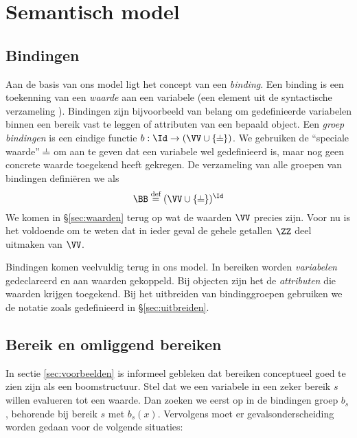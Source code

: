\chapter{Semantisch model}

\section{Bindingen}\label{sec:bindingen}

Aan de basis van ons model ligt het concept van een \emph{binding}. Een binding is een toekenning van een \emph{waarde} aan een variabele (een element uit de syntactische verzameling \Id). Bindingen zijn bijvoorbeeld van belang om gedefinieerde variabelen binnen een bereik vast te leggen of attributen van een bepaald object. Een \emph{groep bindingen} is een eindige functie $b : \Id \to (\VV \cup \{\nil\})$. We gebruiken de ``speciale waarde'' $\nil$ om aan te geven dat een variabele wel gedefinieerd is, maar nog geen concrete waarde toegekend heeft gekregen. De verzameling van alle groepen van bindingen definiëren we als
\begin{equation*}
  \BB \DEF (\VV \cup \{\nil\})^\Id%
\end{equation*}
We komen in §\ref{sec:waarden} terug op wat de waarden $\VV$ precies zijn. Voor nu is het voldoende om te weten dat in ieder geval de gehele getallen $\ZZ$ deel uitmaken van $\VV$.

Bindingen komen veelvuldig terug in ons model. In bereiken worden \emph{variabelen} gedeclareerd en aan waarden gekoppeld. Bij objecten zijn het de \emph{attributen} die waarden krijgen toegekend. Bij het uitbreiden van bindinggroepen gebruiken we de notatie zoals gedefinieerd in §\ref{sec:uitbreiden}.


\section{Bereik en omliggend bereiken}
\label{sec:bereiken}

In sectie \ref{sec:voorbeelden} is informeel gebleken dat bereiken conceptueel goed te zien zijn als een boomstructuur. Stel dat we een variabele  in een zeker bereik $s$ willen evalueren tot een waarde. Dan zoeken we  eerst op in de bindingen groep $b_s$, behorende bij bereik $s$ met $b_s(x)$.
Vervolgens moet er gevalsonderscheiding worden gedaan voor de volgende situaties:


